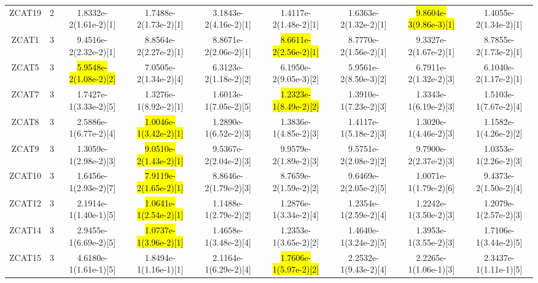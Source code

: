 \documentclass[a4paper,fleqn]{cas-dc}
\newcommand{\highlight}[1]{
	\begingroup
	\sethlcolor{Seashell}%
	\hl{#1}%
	\endgroup
}
\begin{document}
\begin{sloppypar}
\begin{table}[h]
{\begin{tabular}{ccccccccc}
				ZCAT19&2&1.8332e-2(1.61e-2)[1] &1.7488e-2(1.73e-2)[1]	&3.1843e-2(4.16e-2)[1]	&1.4117e-2(1.48e-2)[1]	&1.6363e-2(1.32e-2)[1]	&\highlight{9.8604e-3(9.86e-3)[1]}	&1.4055e-2(1.34e-2)[1]	\\
				
				ZCAT1&3&9.4516e-2(2.32e-2)[1] &8.8564e-2(2.27e-2)[1]	&8.8671e-2(2.06e-2)[1]	&\highlight{8.6611e-2(2.56e-2)[1]}	&8.7770e-2(1.56e-2)[1]	&9.3327e-2(1.67e-2)[1]	&8.7855e-2(1.73e-2)[1]	\\
				
				ZCAT5&3&\highlight{5.9548e-2(1.08e-2)[2]} &7.0505e-2(1.34e-2)[4]	&6.3123e-2(1.18e-2)[2]	&6.1950e-2(9.05e-3)[2]	&5.9561e-2(8.50e-3)[2]	&6.7911e-2(1.32e-2)[3]	&6.1040e-2(1.17e-2)[1]	\\
				
				ZCAT7&3&1.7427e-1(3.33e-2)[5] &1.3276e-1(8.92e-2)[1]	&1.6013e-1(7.05e-2)[5]	&\highlight{1.2323e-1(8.49e-2)[2]}	&1.3910e-1(7.23e-2)[3]	&1.3343e-1(6.19e-2)[3]	&1.5103e-1(7.67e-2)[4]	\\
				
				ZCAT8&3&2.5886e-1(6.77e-2)[4] &\highlight{1.0046e-1(3.42e-2)[1]}	&1.2890e-1(6.52e-2)[3]	&1.3836e-1(4.85e-2)[3]	&1.4117e-1(5.18e-2)[3]	&1.3020e-1(4.46e-2)[3]	&1.1582e-1(4.26e-2)[2]	\\
				
				ZCAT9&3&1.3059e-1(2.98e-2)[3] &\highlight{9.0510e-2(1.43e-2)[1]}	&9.5367e-2(2.04e-2)[3]	&9.9579e-2(1.89e-2)[3]	&9.5751e-2(2.08e-2)[2]	&9.7900e-2(2.37e-2)[3]	&1.0353e-1(2.26e-2)[3]	\\
				
				ZCAT10&3&1.6456e-1(2.93e-2)[7] &\highlight{7.9119e-2(1.65e-2)[1]}	&8.8646e-2(1.79e-2)[3]	&8.7659e-2(1.59e-2)[2]	&9.6469e-2(2.05e-2)[5]	&1.0071e-1(1.79e-2)[6]	&9.4373e-2(1.50e-2)[4]	\\
				
				ZCAT12&3&2.1914e-1(1.40e-1)[5] &\highlight{1.0641e-1(2.54e-2)[1]}	&1.1488e-1(2.79e-2)[2]	&1.2876e-1(3.34e-2)[4]	&1.2354e-1(2.59e-2)[4]	&1.2242e-1(3.50e-2)[3]	&1.2079e-1(2.57e-2)[3]	\\
				
				ZCAT14&3&2.9455e-1(6.69e-2)[5] &\highlight{1.0737e-1(3.96e-2)[1]}	&1.4658e-1(3.48e-2)[4]	&1.2353e-1(3.65e-2)[2]	&1.4640e-1(3.24e-2)[5]	&1.3953e-1(3.55e-2)[3]	&1.7106e-1(3.44e-2)[5]	\\
				
				ZCAT15&3&4.6180e-1(1.61e-1)[5] &1.8494e-1(1.16e-1)[1]	&2.1164e-1(6.29e-2)[4]	&\highlight{1.7606e-1(5.97e-2)[2]}	&2.2532e-1(9.43e-2)[4]	&2.2265e-1(1.06e-1)[3]	&2.3437e-1(1.11e-1)[5]	\\
				

\end{tabular}}
\end{table}
\end{sloppypar}
\end{document}
